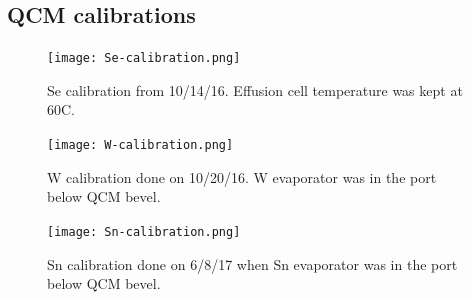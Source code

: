 \subsection{QCM calibrations}
\begin{figure}[H]
	\centering
	\texttt{[image: Se-calibration.png]} 
	\caption{Se calibration from 10/14/16. Effusion cell temperature was kept at 60C.}
	\label{fig:W calibration}
\end{figure}
\begin{figure}[H]
		\centering
		\texttt{[image: W-calibration.png]} 
		\caption{W calibration done on 10/20/16. W evaporator was in the port below QCM bevel.}
		\label{fig:W calibration}
\end{figure}

\begin{figure}[H]
	\centering
	\texttt{[image: Sn-calibration.png]} 
	\caption{Sn calibration done on 6/8/17 when Sn evaporator was in the port below QCM bevel.}
	\label{fig:W calibration}
\end{figure}